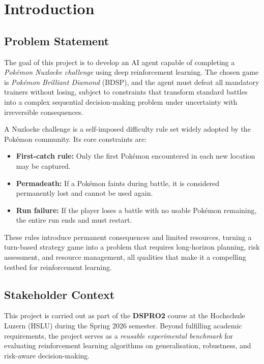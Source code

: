 \chapter{Introduction}

\section{Problem Statement}

The goal of this project is to develop an AI agent capable of completing a
\emph{Pok\'{e}mon Nuzlocke challenge} using deep reinforcement learning.
The chosen game is \emph{Pok\'{e}mon Brilliant Diamond} (BDSP), and the agent
must defeat all mandatory trainers without losing, subject to constraints that
transform standard battles into a complex sequential decision-making problem
under uncertainty with irreversible consequences.

A Nuzlocke challenge is a self-imposed difficulty rule set widely adopted by the
Pok\'{e}mon community.  Its core constraints are:

\begin{itemize}
  \item \textbf{First-catch rule:} Only the first Pok\'{e}mon encountered in
        each new location may be captured.
  \item \textbf{Permadeath:} If a Pok\'{e}mon faints during battle, it is
        considered permanently lost and cannot be used again.
  \item \textbf{Run failure:} If the player loses a battle with no usable
        Pok\'{e}mon remaining, the entire run ends and must restart.
\end{itemize}

These rules introduce permanent consequences and limited resources, turning a
turn-based strategy game into a problem that requires long-horizon planning,
risk assessment, and resource management, all qualities that make it a
compelling testbed for reinforcement learning.

\section{Stakeholder Context}

This project is carried out as part of the \textbf{DSPRO2} course at the
Hochschule Luzern (HSLU) during the Spring 2026 semester.  Beyond fulfilling
academic requirements, the project serves as a \emph{reusable experimental
benchmark} for evaluating reinforcement learning algorithms on generalisation,
robustness, and risk-aware decision-making.

